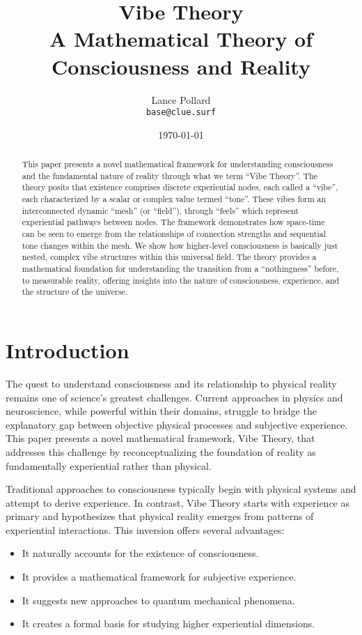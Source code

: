 \documentclass{article}
\title{
  {\huge \textbf{Vibe Theory}} \\ %
  \large A Mathematical Theory of Consciousness and Reality
}
\author{Lance Pollard \\ \texttt{base@clue.surf}}
\date{\today}
\date{}
\theoremstyle{definition}
\theoremstyle{axiom}
\theoremstyle{theorem}
\theoremstyle{lemma}
\theoremstyle{proposition}
\begin{document}
\maketitle

\begin{abstract}
This paper presents a novel mathematical framework for understanding consciousness and the fundamental nature of reality through what we term \enquote{Vibe Theory}. The theory posits that existence comprises discrete experiential nodes, each called a \enquote{vibe}, each characterized by a scalar or complex value termed \enquote{tone}. These vibes form an interconnected dynamic \enquote{mesh} (or \enquote{field}), through \enquote{feels} which represent experiential pathways between nodes. The framework demonstrates how space-time can be seen to emerge from the relationships of connection strengths and sequential tone changes within the mesh. We show how higher-level consciousness is basically just nested, complex vibe structures within this universal field. The theory provides a mathematical foundation for understanding the transition from a \enquote{nothingness} before, to measurable reality, offering insights into the nature of consciousness, experience, and the structure of the universe.
\end{abstract}
\section{Introduction}

The quest to understand consciousness and its relationship to physical reality remains one of science's greatest challenges. Current approaches in physics and neuroscience, while powerful within their domains, struggle to bridge the explanatory gap between objective physical processes and subjective experience. This paper presents a novel mathematical framework, Vibe Theory, that addresses this challenge by reconceptualizing the foundation of reality as fundamentally experiential rather than physical.

Traditional approaches to consciousness typically begin with physical systems and attempt to derive experience. In contrast, Vibe Theory starts with experience as primary and hypothesizes that physical reality emerges from patterns of experiential interactions. This inversion offers several advantages:

\begin{itemize}
\item It naturally accounts for the existence of consciousness.
\item It provides a mathematical framework for subjective experience.
\item It suggests new approaches to quantum mechanical phenomena.
\item It creates a formal basis for studying higher experiential dimensions.
\end{itemize}
\end{document}
